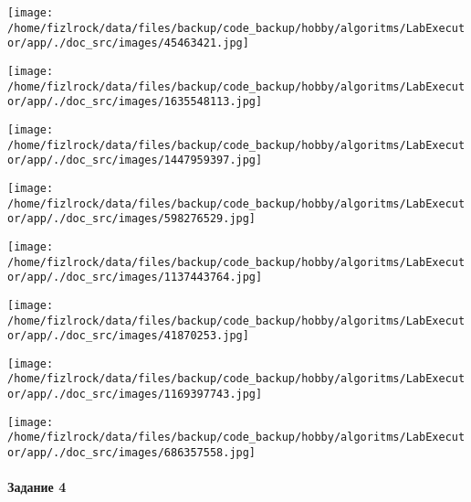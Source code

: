 \documentclass[a4paper, 12pt]{article}
\begin{document}
\texttt{[image: /home/fizlrock/data/files/backup/code\_backup/hobby/algoritms/LabExecutor/app/./doc\_src/images/45463421.jpg]}

\texttt{[image: /home/fizlrock/data/files/backup/code\_backup/hobby/algoritms/LabExecutor/app/./doc\_src/images/1635548113.jpg]}

\texttt{[image: /home/fizlrock/data/files/backup/code\_backup/hobby/algoritms/LabExecutor/app/./doc\_src/images/1447959397.jpg]}

\texttt{[image: /home/fizlrock/data/files/backup/code\_backup/hobby/algoritms/LabExecutor/app/./doc\_src/images/598276529.jpg]}

\texttt{[image: /home/fizlrock/data/files/backup/code\_backup/hobby/algoritms/LabExecutor/app/./doc\_src/images/1137443764.jpg]}

\texttt{[image: /home/fizlrock/data/files/backup/code\_backup/hobby/algoritms/LabExecutor/app/./doc\_src/images/41870253.jpg]}

\texttt{[image: /home/fizlrock/data/files/backup/code\_backup/hobby/algoritms/LabExecutor/app/./doc\_src/images/1169397743.jpg]}

\texttt{[image: /home/fizlrock/data/files/backup/code\_backup/hobby/algoritms/LabExecutor/app/./doc\_src/images/686357558.jpg]}
\pagebreak
\paragraph{Задание 4}
\end{document}
